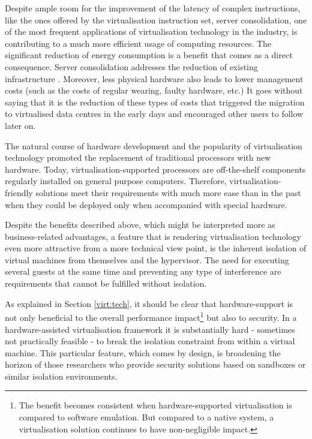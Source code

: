 Despite ample room for the improvement of the latency of complex instructions, like the ones offered by the virtualisation instruction set, server consolidation, one of the most frequent applications of virtualisation technology in the industry, is contributing to a much more efficient usage of computing resources. The significant reduction of energy consumption is a benefit that comes as a direct consequence. Server consolidation addresses the reduction of existing infrastructure \cite{consolidation}. Moreover, less physical hardware also leads to lower management costs (such as the costs of regular wearing, faulty hardware, etc.) 
It goes without saying that it is the reduction of these types of costs that triggered the migration to virtualised data centres in the early days and encouraged other users to follow later on.%

The natural course of hardware development and the popularity of virtualisation technology promoted the replacement of traditional processors with new hardware. Today, virtualisation-supported processors are off-the-shelf components regularly installed on general purpose computers. Therefore, virtualisation-friendly solutions meet their requirements with much more ease than in the past when they could be deployed only when accompanied with special hardware.

Despite the benefits described above, which might be interpreted more as business-related advantages, a feature that is rendering virtualisation technology even more attractive from a more technical view point, is the inherent isolation of virtual machines from themselves and the hypervisor. The need for executing several guests at the same time and preventing any type of interference are requirements that cannot be fulfilled without isolation.

As explained in Section \ref{virt:tech}, it should be clear that hardware-support is not only beneficial to the overall performance impact\footnote{The benefit becomes consistent when hardware-supported virtualisation is compared to software emulation. But compared to a native system, a virtualisation solution continues to have non-negligible impact.} but also to security. In a hardware-assisted virtualisation framework it is substantially hard - sometimes not practically feasible - to break the isolation constraint from within a virtual machine. 
This particular feature, which comes by design, is broadening the horizon of those researchers who provide security solutions based on sandboxes or similar isolation environments.%
 

